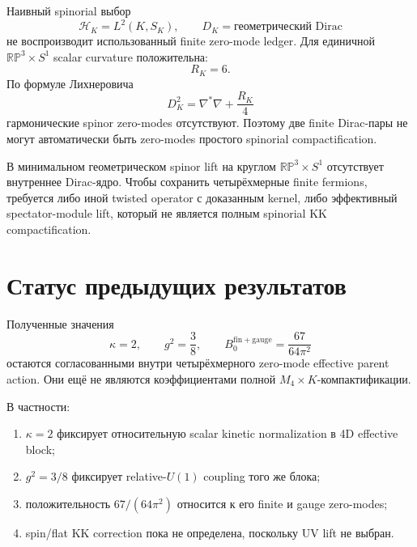 Наивный spinorial выбор
\begin{equation}
 \mathcal H_K=L^2(K,S_K),
 \qquad
 D_K=\text{геометрический Dirac}
\end{equation}
не воспроизводит использованный finite zero-mode ledger. Для единичной
\(\mathbb{RP}^3\times S^1\) scalar curvature положительна:
\begin{equation}
 R_K=6.
\end{equation}
По формуле Лихнеровича
\begin{equation}
 D_K^2=\nabla^*\nabla+\frac{R_K}{4}
\end{equation}
гармонические spinor zero-modes отсутствуют. Поэтому две finite Dirac-пары
не могут автоматически быть zero-modes простого spinorial compactification.

\begin{proposition}
В минимальном геометрическом spinor lift на круглом
\(\mathbb{RP}^3\times S^1\) отсутствует внутреннее Dirac-ядро. Чтобы
сохранить четырёхмерные finite fermions, требуется либо иной twisted
operator с доказанным kernel, либо эффективный spectator-module lift,
который не является полным spinorial KK compactification.
\end{proposition}

\section{Статус предыдущих результатов}

Полученные значения
\begin{equation}
 \kappa=2,
 \qquad
 g^2=\frac38,
 \qquad
 B_0^{\mathrm{fin+gauge}}=\frac{67}{64\pi^2}
\end{equation}
остаются согласованными внутри четырёхмерного zero-mode effective parent
action. Они ещё не являются коэффициентами полной
\(M_4\times K\)-компактификации.

В частности:
\begin{enumerate}
 \item \(\kappa=2\) фиксирует относительную scalar kinetic normalization
 в 4D effective block;
 \item \(g^2=3/8\) фиксирует relative-\(U(1)\) coupling того же блока;
 \item положительность \(67/(64\pi^2)\) относится к его finite и gauge
 zero-modes;
 \item spin/flat KK correction пока не определена, поскольку UV lift не
 выбран.
\end{enumerate}

